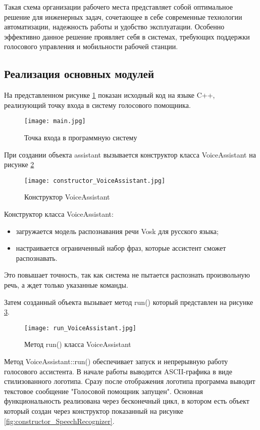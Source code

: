 Такая схема организации рабочего места представляет собой оптимальное решение для инженерных задач, сочетающее в себе современные технологии автоматизации, надежность работы и удобство эксплуатации. Особенно эффективно данное решение проявляет себя в системах, требующих поддержки голосового управления и мобильности рабочей станции.

\subsection{Реализация основных модулей}

На представленном рисунке \ref{fig:main.cpp} показан исходный код на языке C++, реализующий точку входа в систему голосового помощника.
\begin{figure}[H]
	\centering
	\texttt{[image: main.jpg]}
	\caption{Точка входа в программную систему}
	\label{fig:main.cpp}
\end{figure}

При создании объекта assistant вызывается конструктор класса VoiceAssistant на рисунке \ref{fig:constructor_VoiceAssistant}

\begin{figure}[H]
	\centering
	\texttt{[image: constructor\_VoiceAssistant.jpg]}
	\caption{Конструктор VoiceAssistant}
	\label{fig:constructor_VoiceAssistant}
\end{figure}

Конструктор класса VoiceAssistant:
\begin{itemize}
 	\item загружается модель распознавания речи Vosk для русского языка;
	\item настраивается ограниченный набор фраз, которые ассистент сможет распознавать.
\end{itemize}

Это повышает точность, так как система не пытается распознать произвольную речь, а ждет только указанные команды.

Затем созданный объекта вызывает метод run() который представлен на рисунке \ref{fig:run_VoiceAssistant}.

\begin{figure}[H]
	\centering
	\texttt{[image: run\_VoiceAssistant.jpg]}
	\caption{Метод run() класса VoiceAssistant}
	\label{fig:run_VoiceAssistant}
\end{figure}

Метод VoiceAssistant::run() обеспечивает запуск и непрерывную работу голосового ассистента. В начале работы выводится ASCII-графика в виде стилизованного логотипа. Сразу после отображения логотипа программа выводит текстовое сообщение "Голосовой помощник запущен". Основная функциональность реализована через бесконечный цикл, в котором есть объект который создан через конструктор показанный на рисунке \ref{fig:constructor_SpeechRecognizer}.

